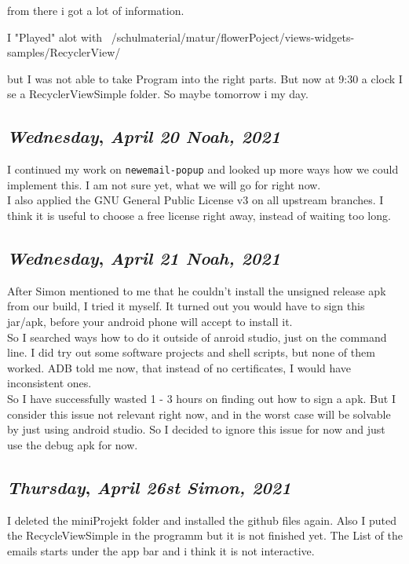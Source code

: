 from there i got a lot of information. 

I "Played" alot with ~/schulmaterial/matur/flowerPoject/views-widgets-samples/RecyclerView/

but I was not able to take Program into the right parts. But now at 9:30 a clock I se a RecyclerViewSimple folder. So maybe tomorrow i my day. 



\def\day{\textit{April 20 Noah, 2021}}
\def\weekday{\textit{Wednesday}}
\subsection*{\weekday, \day}

I continued my work on \texttt{newemail-popup} and looked up more ways how we  could implement this. I am not sure yet, what we will go for right now.\\

I also applied the GNU General Public License v3 on all upstream branches. I think it is useful to choose a free license right away, instead of waiting too long.

\def\day{\textit{April 21 Noah, 2021}}
\def\weekday{\textit{Wednesday}}
\subsection*{\weekday, \day}

After Simon mentioned to me that he couldn't install the unsigned release apk from our build, I tried it myself. It turned out you would have to sign this jar/apk, before your android phone will accept to install it.\\

So I searched ways how to do it outside of anroid studio, just on the command line. I did try out some software projects and shell scripts, but none of them worked. ADB told me now, that instead of no certificates, I would have inconsistent ones.\\

So I have successfully wasted 1 - 3 hours on finding out how to sign a apk. But I consider this issue not relevant right now, and in the worst case will be solvable by just using android studio. So I decided to ignore this issue for now and just use the debug apk for now.



\def\day{\textit{April 26st Simon, 2021}}
\def\weekday{\textit{Thursday}}
\subsection*{\weekday, \day}

I deleted the miniProjekt folder and installed the github files again.
Also I puted the RecycleViewSimple in the programm but it is not finished yet. 
The List of the emails starts under the app bar and i think it is not interactive. 

















